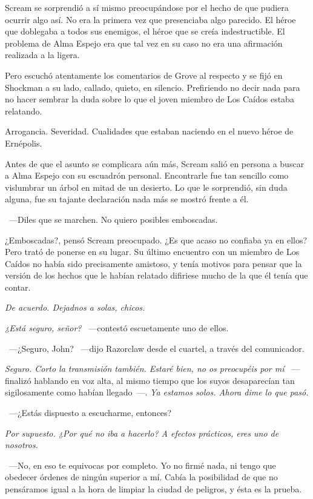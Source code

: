 Scream se sorprendió a sí mismo preocupándose por el hecho de que pudiera ocurrir algo así. No era la primera vez que presenciaba algo parecido. El héroe que doblegaba a todos sus enemigos, el héroe que se creía indestructible. El problema de Alma Espejo era que tal vez en su caso no era una afirmación realizada a la ligera.

Pero escuchó atentamente los comentarios de Grove al respecto y se fijó en Shockman a su lado, callado, quieto, en silencio. Prefiriendo no decir nada para no hacer sembrar la duda sobre lo que el joven miembro de Los Caídos estaba relatando.

Arrogancia. Severidad. Cualidades que estaban naciendo en el nuevo héroe de Ernépolis.

Antes de que el asunto se complicara aún más, Scream salió en persona a buscar a Alma Espejo con su escuadrón personal. Encontrarle fue tan sencillo como vislumbrar un árbol en mitad de un desierto. Lo que le sorprendió, sin duda alguna, fue su tajante declaración nada más se mostró frente a él.

~---Diles que se marchen. No quiero posibles emboscadas.

¿Emboscadas?, pensó Scream preocupado. ¿Es que acaso no confiaba ya en ellos? Pero trató de ponerse en su lugar. Su último encuentro con un miembro de Los Caídos no había sido precisamente amistoso, y tenía motivos para pensar que la versión de los hechos que le habían relatado difiriese mucho de la que él tenía que contar.

\emph{De acuerdo. Dejadnos a solas, chicos.}

\emph{¿Está seguro, señor?} ~---contestó escuetamente uno de ellos.

~---¿Seguro, John? ~---dijo Razorclaw desde el cuartel, a través del comunicador.

\emph{Seguro. Corto la transmisión también. Estaré bien, no os preocupéis por mí} ~---finalizó hablando en voz alta, al mismo tiempo que los suyos desaparecían tan sigilosamente como habían llegado~---. \emph{Ya estamos solos. Ahora dime lo que pasó.}

~---¿Estás dispuesto a escucharme, entonces?

\emph{Por supuesto. ¿Por qué no iba a hacerlo? A efectos prácticos, eres uno de nosotros.}

~---No, en eso te equivocas por completo. Yo no firmé nada, ni tengo que obedecer órdenes de ningún superior a mí. Cabía la posibilidad de que no pensáramos igual a la hora de limpiar la ciudad de peligros, y ésta es la prueba.

